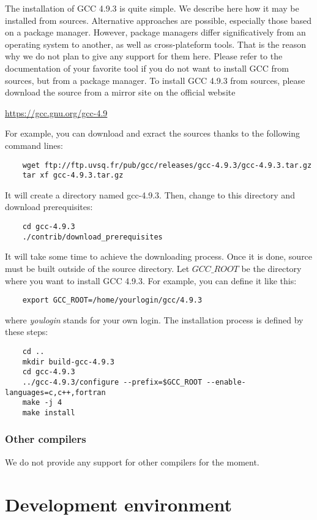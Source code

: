\documentclass[12pt]{book}
\begin{document}
The installation of GCC 4.9.3 is quite simple. We describe here how it may be installed from sources. Alternative approaches are possible, especially those based on a package manager. However, package managers differ significatively from an operating system to another, as well as cross-plateform tools. That is the reason why we do not plan to give any support for them here. Please refer to the documentation of your favorite tool if you do not want to install GCC from sources, but from a package manager. To install GCC 4.9.3 from sources, please download the source from a mirror site on the official website 
\begin{center}
	\url{https://gcc.gnu.org/gcc-4.9}
\end{center}
For example, you can download and exract the sources thanks to the following command lines:
\lstset{language=bash} 
\begin{lstlisting}
	wget ftp://ftp.uvsq.fr/pub/gcc/releases/gcc-4.9.3/gcc-4.9.3.tar.gz
	tar xf gcc-4.9.3.tar.gz
\end{lstlisting}
It will create a directory named gcc-4.9.3. Then, change to this directory and download prerequisites:
\begin{lstlisting}
	cd gcc-4.9.3
	./contrib/download_prerequisites
\end{lstlisting}
It will take some time to achieve the downloading process. Once it is done, source must be built outside of the source directory. Let $GCC\_ROOT$ be the directory where you want to install GCC 4.9.3. For example, you can define it like this:
\begin{lstlisting}
	export GCC_ROOT=/home/yourlogin/gcc/4.9.3
\end{lstlisting}
where \textit{youlogin} stands for your own login. The installation process is defined by these steps:
\begin{lstlisting}
	cd ..
	mkdir build-gcc-4.9.3
	cd gcc-4.9.3
	../gcc-4.9.3/configure --prefix=$GCC_ROOT --enable-languages=c,c++,fortran
	make -j 4
	make install
\end{lstlisting}




\subsection{Other compilers}

We do not provide any support for other compilers for the moment.



\chapter{Development environment}
\end{document}
